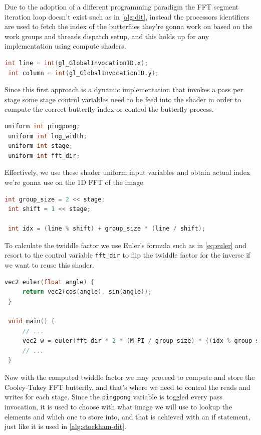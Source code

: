 \documentclass[
  oneside,
  11pt, a4paper,
  footinclude=true,
  headinclude=true,
  cleardoublepage=empty
]{scrbook}
\begin{document}
Due to the adoption of a different programming paradigm the FFT segment iteration loop doesn't exist such as in \autoref{alg:dit}, instead the processors identifiers are used to fetch the index of the butterflies they're gonna work on based on the work groups and threads dispatch setup, and this holds up for any implementation using compute shaders.

\begin{lstlisting}[language=C]
 int line = int(gl_GlobalInvocationID.x);
 int column = int(gl_GlobalInvocationID.y);
\end{lstlisting}

Since this first approach is a dynamic implementation that invokes a pass per stage some stage control variables need to be feed into the shader in order to compute the correct butterfly index or control the butterfly process.

\begin{lstlisting}[language=C]
 uniform int pingpong;
 uniform int log_width;
 uniform int stage;
 uniform int fft_dir;
\end{lstlisting}

Effectively, we use these shader uniform input variables and obtain actual index we're gonna use on the 1D FFT of the image.

\begin{lstlisting}[language=C]
 int group_size = 2 << stage;
 int shift = 1 << stage;
 
 int idx = (line % shift) + group_size * (line / shift);
\end{lstlisting}

To calculate the twiddle factor we use Euler's formula such as in \autoref{eq:euler} and resort to the control variable \texttt{fft\_dir} to flip the twiddle factor for the inverse if we want to reuse this shader.

\begin{lstlisting}[language=C]
 vec2 euler(float angle) {
     return vec2(cos(angle), sin(angle));
 }
 
 void main() {
     // ...
     vec2 w = euler(fft_dir * 2 * (M_PI / group_size) * ((idx % group_size) % shift));
     // ...
 }
\end{lstlisting}

Now with the computed twiddle factor we may proceed to compute and store the Cooley-Tukey FFT butterfly, and that's where we need to control the reads and writes for each stage. Since the \texttt{pingpong} variable is toggled every pass invocation, it is used to choose with what image we will use to lookup the elements and which one to store into, and that is achieved with an if statement, just like it is used in \autoref{alg:stockham-dit}.
\end{document}
